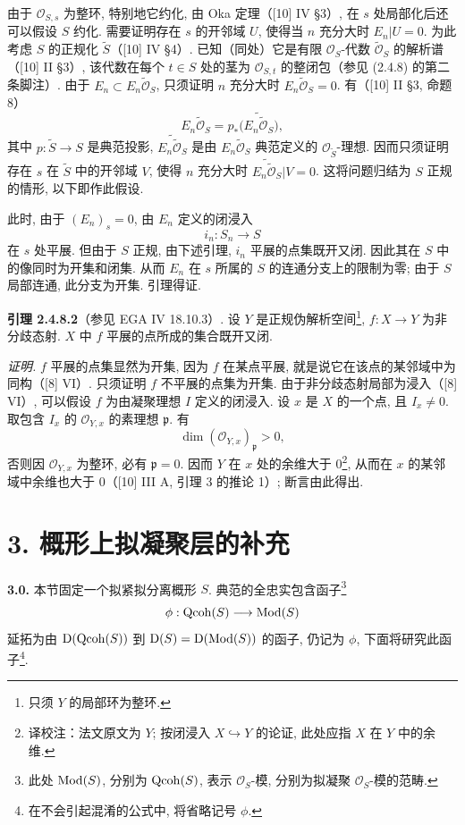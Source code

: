 由于 $\mathcal O_{S,s}$ 为整环, 特别地它约化, 由 Oka 定理（[10] IV §3）, 在 $s$ 处局部化后还可以假设 $S$ 约化. 需要证明存在 $s$ 的开邻域 $U$, 使得当 $n$ 充分大时 $E_n|U=0$. 为此考虑 $S$ 的正规化 $\widetilde S$（[10] IV §4）. 已知（同处）它是有限 $\mathcal O_S$-代数 $\widetilde{\mathcal O}_S$ 的解析谱（[10] II §3）, 该代数在每个 $t\in S$ 处的茎为 $\mathcal O_{S,t}$ 的整闭包（参见 (2.4.8) 的第二条脚注）. 由于 $E_n\subset E_n\widetilde{\mathcal O}_S$, 只须证明 $n$ 充分大时 $E_n\widetilde{\mathcal O}_S=0$. 有（[10] II §3, 命题 8）
\[
E_n\widetilde{\mathcal O}_S=p_*\bigl(\widetilde{E_n\widetilde{\mathcal O}_S}\bigr),
\]
其中 $p:\widetilde S\to S$ 是典范投影, $\widetilde{E_n\widetilde{\mathcal O}_S}$ 是由 $E_n\widetilde{\mathcal O}_S$ 典范定义的 $\mathcal O_{\widetilde S}$-理想. 因而只须证明存在 $s$ 在 $\widetilde S$ 中的开邻域 $V$, 使得 $n$ 充分大时 $\widetilde{E_n\widetilde{\mathcal O}_S}|V=0$. 这将问题归结为 $S$ 正规的情形, 以下即作此假设.

此时, 由于 $(E_n)_s=0$, 由 $E_n$ 定义的闭浸入
\[
 i_n:S_n\longrightarrow S
\]
在 $s$ 处平展. 但由于 $S$ 正规, 由下述引理, $i_n$ 平展的点集既开又闭. 因此其在 $S$ 中的像同时为开集和闭集. 从而 $E_n$ 在 $s$ 所属的 $S$ 的连通分支上的限制为零; 由于 $S$ 局部连通, 此分支为开集. 引理得证.

\textbf{引理 2.4.8.2}（参见 EGA IV 18.10.3）. 设 $Y$ 是正规伪解析空间\footnote{只须 $Y$ 的局部环为整环.}, $f:X\to Y$ 为非分歧态射. $X$ 中 $f$ 平展的点所成的集合既开又闭.

\emph{证明.} $f$ 平展的点集显然为开集, 因为 $f$ 在某点平展, 就是说它在该点的某邻域中为同构（[8] VI）. 只须证明 $f$ 不平展的点集为开集. 由于非分歧态射局部为浸入（[8] VI）, 可以假设 $f$ 为由凝聚理想 $I$ 定义的闭浸入. 设 $x$ 是 $X$ 的一个点, 且 $I_x\ne0$. 取包含 $I_x$ 的 $\mathcal O_{Y,x}$ 的素理想 $\mathfrak p$. 有
\[
 \dim(\mathcal O_{Y,x})_{\mathfrak p}>0,
\]
否则因 $\mathcal O_{Y,x}$ 为整环, 必有 $\mathfrak p=0$. 因而 $Y$ 在 $x$ 处的余维大于 $0$\footnote{译校注：法文原文为 $Y$; 按闭浸入 $X\hookrightarrow Y$ 的论证, 此处应指 $X$ 在 $Y$ 中的余维.}, 从而在 $x$ 的某邻域中余维也大于 $0$（[10] III A, 引理 3 的推论 1）; 断言由此得出.

\section*{3. 概形上拟凝聚层的补充\protect\footnotemark}

\textbf{3.0.} 本节固定一个拟紧拟分离概形 $S$. 典范的全忠实包含函子\footnote{此处 $\operatorname{Mod}(S)$, 分别为 $\operatorname{Qcoh}(S)$, 表示 $\mathcal O_S$-模, 分别为拟凝聚 $\mathcal O_S$-模的范畴.}
\[
 \phi:\operatorname{Qcoh}(S)\longrightarrow\operatorname{Mod}(S)
\]
延拓为由 $\mathrm D(\operatorname{Qcoh}(S))$ 到 $\mathrm D(S)=\mathrm D(\operatorname{Mod}(S))$ 的函子, 仍记为 $\phi$, 下面将研究此函子\footnote{在不会引起混淆的公式中, 将省略记号 $\phi$.}.

